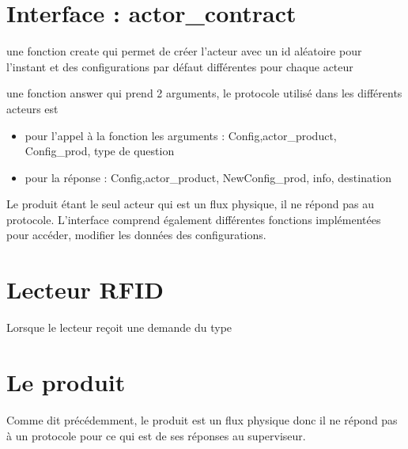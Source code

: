 	\section{Interface : actor_contract}

	 une fonction create qui permet de créer l'acteur avec un id aléatoire pour l'instant et des configurations par défaut différentes pour chaque acteur
	
	 une fonction answer qui prend 2 arguments, le protocole utilisé dans les différents acteurs est 
	\begin{itemize}
	
	 \item pour l'appel à la fonction les arguments : {Config,{actor\_product, Config\_prod, type de 				question}}
	\item pour la réponse : {Config,{actor\_product, NewConfig\_prod, info}, destination}

	\end{itemize}
	 Le produit étant le seul acteur qui est un flux physique, il ne répond pas au protocole. 
	 L'interface comprend également différentes fonctions implémentées pour accéder, modifier les données des configurations.
	 
	 
	 \section{Lecteur RFID}
	 Lorsque le lecteur reçoit une demande du type 
	 
	 \section{Le produit}
	 
	 Comme dit précédemment, le produit est un flux physique donc il ne répond pas à un protocole pour ce qui est de ses réponses au superviseur. 
	 
